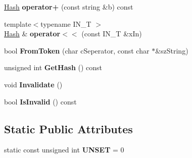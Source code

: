 \begin{DoxyCompactItemize}
\item 
\hypertarget{class_k_g_e_1_1_hash_ab3673c02ea07f72ee43f7495b889af5b}{\hyperlink{class_k_g_e_1_1_hash}{Hash} {\bfseries operator+} (const string \&b) const }\label{class_k_g_e_1_1_hash_ab3673c02ea07f72ee43f7495b889af5b}

\item 
\hypertarget{class_k_g_e_1_1_hash_afc6d39e74c0200a8a4d25ee2a5aa55f6}{{\footnotesize template$<$typename I\-N\-\_\-\-T $>$ }\\\hyperlink{class_k_g_e_1_1_hash}{Hash} \& {\bfseries operator$<$$<$} (const I\-N\-\_\-\-T \&x\-In)}\label{class_k_g_e_1_1_hash_afc6d39e74c0200a8a4d25ee2a5aa55f6}

\item 
\hypertarget{class_k_g_e_1_1_hash_a50fbb3432c9bff1ca824881c99962baa}{bool {\bfseries From\-Token} (char c\-Seperator, const char $\ast$\&sz\-String)}\label{class_k_g_e_1_1_hash_a50fbb3432c9bff1ca824881c99962baa}

\item 
\hypertarget{class_k_g_e_1_1_hash_a2e702fe8b3fbf91c78a205b99599029e}{unsigned int {\bfseries Get\-Hash} () const }\label{class_k_g_e_1_1_hash_a2e702fe8b3fbf91c78a205b99599029e}

\item 
\hypertarget{class_k_g_e_1_1_hash_a0df372f141f5a28e430e388ed845aee1}{void {\bfseries Invalidate} ()}\label{class_k_g_e_1_1_hash_a0df372f141f5a28e430e388ed845aee1}

\item 
\hypertarget{class_k_g_e_1_1_hash_a8bfa65740d0ff904a1aa319263c3d4a0}{bool {\bfseries Is\-Invalid} () const }\label{class_k_g_e_1_1_hash_a8bfa65740d0ff904a1aa319263c3d4a0}

\end{DoxyCompactItemize}
\subsection*{Static Public Attributes}
\begin{DoxyCompactItemize}
\item 
\hypertarget{class_k_g_e_1_1_hash_a9912d509163e033a5e3624e533cc81f4}{static const unsigned int {\bfseries U\-N\-S\-E\-T} = 0}\label{class_k_g_e_1_1_hash_a9912d509163e033a5e3624e533cc81f4}

\end{DoxyCompactItemize}

